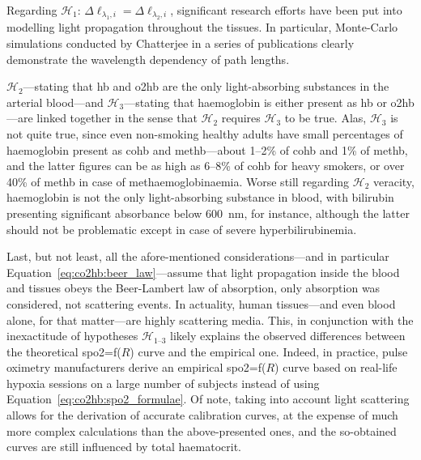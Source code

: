Regarding $\mathcal{H}_1$: $\Delta\ell_{\lambda_1, i} = \Delta\ell_{\lambda_2, i}$, significant research efforts have been put into modelling light propagation throughout the tissues. In particular, Monte-Carlo simulations conducted by Chatterjee \etal{} in a series of publications\cite{chatterjee2017, chatterjee2018, chatterjee2019, chatterjee2020} clearly demonstrate the wavelength dependency of path lengths.

$\mathcal{H}_2$---stating that \gls{hb} and \gls{o2hb} are the only light-absorbing substances in the arterial blood---and $\mathcal{H}_3$---stating that haemoglobin is either present as \gls{hb} or \gls{o2hb}---are linked together in the sense that $\mathcal{H}_2$ requires $\mathcal{H}_3$ to be true. Alas, $\mathcal{H}_3$ is not quite true, since even non-smoking healthy adults have small percentages of haemoglobin present as \gls{cohb} and \gls{methb}---about 1--2\% of \gls{cohb} and 1\% of \gls{methb}, and the latter figures can be as high as 6--8\% of \gls{cohb} for heavy smokers, or over 40\% of \gls{methb} in case of methaemoglobinaemia\cite{nordenberg1990, ashbernal2004, remigio2022}. Worse still regarding $\mathcal{H}_2$ veracity, haemoglobin is not the only light-absorbing substance in blood, with bilirubin presenting significant absorbance below 600~nm, for instance, although the latter should not be problematic except in case of severe hyperbilirubinemia\cite{beall1989, veyckemans1990, meinke2007}.

Last, but not least, all the afore-mentioned considerations---and in particular Equation~\ref{eq:co2hb:beer_law}---assume that light propagation inside the blood and tissues obeys the Beer-Lambert law of absorption, \ie{} only absorption was considered, not scattering events. In actuality, human tissues---and even blood alone, for that matter---are highly scattering media\cite{jacques2013, bosschaart2014}. This, in conjunction with the inexactitude of hypotheses $\mathcal{H}_\text{1--3}$ likely explains the observed differences between the theoretical \gls{spo2}=f($R$) curve and the empirical one. Indeed, in practice, pulse oximetry manufacturers derive an empirical \gls{spo2}=f($R$) curve based on real-life hypoxia sessions on a large number of subjects instead of using Equation~\ref{eq:co2hb:spo2_formulae}\cite[Chap.~10]{webster1997design}. Of note, taking into account light scattering allows for the derivation of accurate calibration curves, at the expense of much more complex calculations than the above-presented ones\cite{schmitt1991}, and the so-obtained curves are still influenced by total haematocrit\cite{mannheimer1997}.

